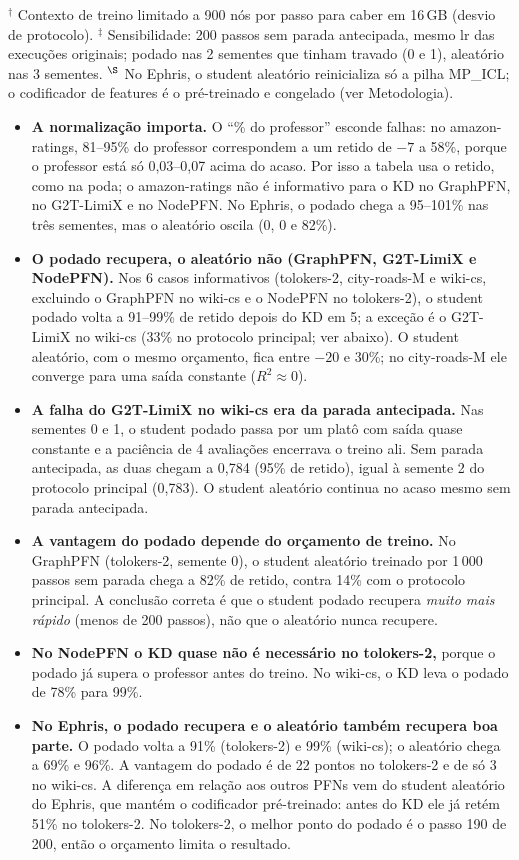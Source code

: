 \documentclass[12pt,a4paper]{article}
\begin{document}
\noindent $^\dagger$ Contexto de treino limitado a 900 nós por passo para caber em 16\,GB (desvio de protocolo). $^\ddagger$ Sensibilidade: 200 passos sem parada antecipada, mesmo lr das execuções originais; podado nas 2 sementes que tinham travado (0 e 1), aleatório nas 3 sementes. $^\S$ No Ephris, o student aleatório reinicializa só a pilha MP\_ICL; o codificador de features é o pré-treinado e congelado (ver Metodologia).

\begin{itemize}
  \item \textbf{A normalização importa.} O ``\% do professor'' esconde falhas: no amazon-ratings, 81--95\% do professor correspondem a um retido de $-7$ a 58\%, porque o professor está só 0,03--0,07 acima do acaso. Por isso a tabela usa o retido, como na poda; o amazon-ratings não é informativo para o KD no GraphPFN, no G2T-LimiX e no NodePFN. No Ephris, o podado chega a 95--101\% nas três sementes, mas o aleatório oscila (0, 0 e 82\%).
  \item \textbf{O podado recupera, o aleatório não (GraphPFN, G2T-LimiX e NodePFN).} Nos 6 casos informativos (tolokers-2, city-roads-M e wiki-cs, excluindo o GraphPFN no wiki-cs e o NodePFN no tolokers-2), o student podado volta a 91--99\% de retido depois do KD em 5; a exceção é o G2T-LimiX no wiki-cs (33\% no protocolo principal; ver abaixo). O student aleatório, com o mesmo orçamento, fica entre $-20$ e 30\%; no city-roads-M ele converge para uma saída constante ($R^2 \approx 0$).
  \item \textbf{A falha do G2T-LimiX no wiki-cs era da parada antecipada.} Nas sementes 0 e 1, o student podado passa por um platô com saída quase constante e a paciência de 4 avaliações encerrava o treino ali. Sem parada antecipada, as duas chegam a 0,784 (95\% de retido), igual à semente 2 do protocolo principal (0,783). O student aleatório continua no acaso mesmo sem parada antecipada.
  \item \textbf{A vantagem do podado depende do orçamento de treino.} No GraphPFN (tolokers-2, semente 0), o student aleatório treinado por 1\,000 passos sem parada chega a 82\% de retido, contra 14\% com o protocolo principal. A conclusão correta é que o student podado recupera \emph{muito mais rápido} (menos de 200 passos), não que o aleatório nunca recupere.
  \item \textbf{No NodePFN o KD quase não é necessário no tolokers-2,} porque o podado já supera o professor antes do treino. No wiki-cs, o KD leva o podado de 78\% para 99\%.
  \item \textbf{No Ephris, o podado recupera e o aleatório também recupera boa parte.} O podado volta a 91\% (tolokers-2) e 99\% (wiki-cs); o aleatório chega a 69\% e 96\%. A vantagem do podado é de 22 pontos no tolokers-2 e de só 3 no wiki-cs. A diferença em relação aos outros PFNs vem do student aleatório do Ephris, que mantém o codificador pré-treinado: antes do KD ele já retém 51\% no tolokers-2. No tolokers-2, o melhor ponto do podado é o passo 190 de 200, então o orçamento limita o resultado.
\end{itemize}
\end{document}
